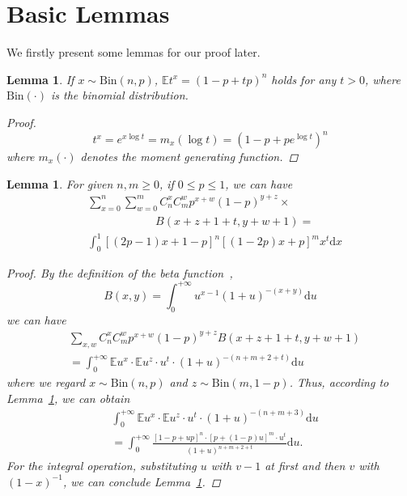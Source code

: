 \documentclass{article}
\newtheorem{lemma}[theorem]{Lemma}
\begin{document}
\section{Basic Lemmas}
We firstly present some lemmas for our proof later.
\begin{lemma}
\label{MoGene}
If $x\sim \mathrm{Bin}(n,p)$, $\mathbb{E}t^x= \left(1-p+tp\right)^{n}$ holds for any $t>0$, where $\mathrm{Bin}(\cdot)$ is the binomial distribution.
\begin{proof}
\begin{equation}
t^x = e^{x\log t}=m_x(\log t)= \left(1-p+pe^{\log t}\right)^{n}
\end{equation}
where $m_x(\cdot)$ denotes the moment generating function.
\end{proof}
\end{lemma}

\begin{lemma}
\label{SolveF}
For given $n,m\geq 0$, if $0\leq p\leq 1$, we can have
\begin{equation*}
\begin{split}
&{\sum}_{x=0}^{n}{\sum}_{w=0}^{m} C_{n}^{x}C_{m}^{w}p^{x+w}(1-p)^{y+z}\times\\
&\qquad\qquad\qquad B(x+z+1+t,y+w+1)=\\
&\int_{0}^{1}[(2p-1)x+1-p]^{n}[(1-2p)x+p]^{m}x^{t}\mathrm{d}x
\end{split}
\end{equation*}
\begin{proof}
By the definition of the beta function~\cite{olver2010nist},
\begin{equation}
B(x, y) = \int_{0}^{+\infty} u^{x-1}(1+u)^{-(x+y)}\mathrm{d}u
\end{equation}
we can have
\begin{align}
&\sum_{x,w} C_{n}^{x}C_{m}^{w}p^{x+w}(1-p)^{y+z}B(x+z+1+t,y+w+1)\nonumber\\
&= \int_{0}^{+\infty} \mathbb{E}u^{x}\cdot\mathbb{E}u^z \cdot u^t\cdot (1+u)^{-(n+m+2+t)}\mathrm{d}u
\end{align}
where we regard $x\sim \mathrm{Bin}(n,p)$ and $z\sim \mathrm{Bin}(m,1-p)$.
Thus, according to Lemma~\ref{MoGene}, we can obtain
\begin{equation}
\begin{split}
&\int_{0}^{+\infty} \mathbb{E}u^{x}\cdot\mathbb{E}u^z \cdot u^t\cdot (1+u)^{-(n+m+3)}\mathrm{d}u\\
&=\int_{0}^{+\infty} \frac{[1-p+up]^n\cdot [p+(1-p)u]^m\cdot u^t}{(1+u)^{n+m+2+t}}\mathrm{d}u.
\end{split}
\end{equation}
For the integral operation, substituting $u$ with $v-1$ at first and then $v$ with $(1-x)^{-1}$, we can conclude Lemma~\ref{SolveF}.
\end{proof}
\end{lemma}
\end{document}
